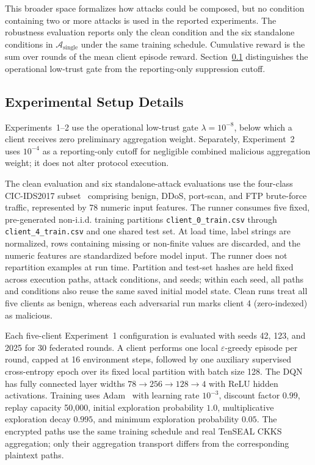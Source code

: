 \documentclass{article}
\begin{document}
This broader space formalizes how attacks could be composed, but no condition
containing two or more attacks is used in the reported experiments. The
robustness evaluation reports only the clean condition and the six standalone
conditions in $\mathcal{A}_{\mathrm{single}}$ under the same training schedule.
Cumulative reward is the sum over rounds of the mean client episode reward.
Section~\ref{sec:supp_experimental_setup_details} distinguishes the operational
low-trust gate from the reporting-only suppression cutoff.

\subsection{Experimental Setup Details}\label{sec:supp_experimental_setup_details}

Experiments~1--2 use the operational low-trust gate
$\lambda=10^{-8}$, below which a client receives zero preliminary
aggregation weight. Separately, Experiment~2 uses $10^{-4}$ as a
reporting-only cutoff for negligible combined malicious aggregation weight;
it does not alter protocol execution.

The clean evaluation and six standalone-attack evaluations use the four-class
CIC-IDS2017 subset~\cite{sharafaldin2018cicids2017,unb_cicids2017} comprising
benign, DDoS, port-scan, and FTP brute-force traffic, represented by 78 numeric
input features. The runner consumes five
fixed, pre-generated non-i.i.d. training partitions
\texttt{client\_0\_train.csv} through \texttt{client\_4\_train.csv} and one
shared test set. At load time, label strings are normalized, rows containing
missing or non-finite values are discarded, and the numeric features are
standardized before model input. The runner does not repartition examples at
run time. Partition and test-set hashes are held fixed across execution paths,
attack conditions, and seeds; within each seed, all paths and conditions also
reuse the same saved initial model state. Clean runs treat all five clients as
benign, whereas each adversarial run marks client 4 (zero-indexed) as malicious.

Each five-client Experiment~1 configuration is evaluated with seeds 42,
123, and 2025 for 30 federated rounds. A client performs one local
$\varepsilon$-greedy episode per round,
capped at 16 environment steps, followed by one auxiliary supervised
cross-entropy epoch over its fixed local partition with batch size 128. The DQN~\cite{mnih2015dqn}
has fully connected layer widths
$78\!\rightarrow\!256\!\rightarrow\!128\!\rightarrow\!4$ with ReLU hidden
activations. Training uses Adam~\cite{kingma2015adam} with learning rate $10^{-3}$, discount factor
$0.99$, replay capacity 50,000, initial exploration probability $1.0$,
multiplicative exploration decay $0.995$, and minimum exploration probability
$0.05$. The encrypted paths use the same training schedule and real TenSEAL
CKKS aggregation; only their aggregation transport differs from the
corresponding plaintext paths.
\end{document}
